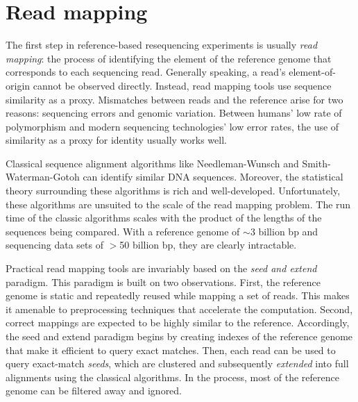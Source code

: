 \documentclass[11pt]{ucthesis}
\begin{document}
\section{Read mapping}

The first step in reference-based resequencing experiments is usually \emph{read mapping}: the process of identifying the element of the reference genome that corresponds to each sequencing read. Generally speaking, a read's element-of-origin cannot be observed directly. Instead, read mapping tools use sequence similarity as a proxy. Mismatches between reads and the reference arise for two reasons: sequencing errors and genomic variation. Between humans' low rate of polymorphism and modern sequencing technologies' low error rates, the use of similarity as a proxy for identity usually works well.

Classical sequence alignment algorithms like Needleman-Wunsch\cite{needleman1970general} and Smith-Waterman-Gotoh\cite{smith1981comparison,gotoh1982improved} can identify similar DNA sequences. Moreover, the statistical theory surrounding these algorithms is rich and well-developed\cite{karlin1990methods,states1991improved}. Unfortunately, these algorithms are unsuited to the scale of the read mapping problem. The run time of the classic algorithms scales with the product of the lengths of the sequences being compared. With a reference genome of $\sim$3 billion bp and sequencing data sets of $>$50 billion bp, they are clearly intractable.

Practical read mapping tools are invariably based on the \emph{seed and extend} paradigm. This paradigm is built on two observations. First, the reference genome is static and repeatedly reused while mapping a set of reads. This makes it amenable to preprocessing techniques that accelerate the computation. Second, correct mappings are expected to be highly similar to the reference. Accordingly, the seed and extend paradigm begins by creating indexes of the reference genome that make it efficient to query exact matches. Then, each read can be used to query exact-match \emph{seeds}, which are clustered and subsequently \emph{extended} into full alignments using the classical algorithms. In the process, most of the reference genome can be filtered away and ignored.
\end{document}
